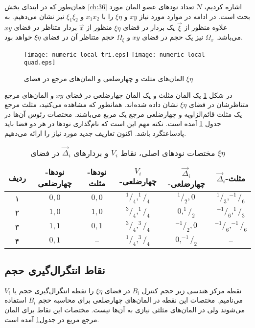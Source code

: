 همان‌طور که در ابتدای بخش \ref{ch:36} اشاره کردیم، $ٔN$ تعداد نود‌های عضو المان مورد بحث است. در ادامه در موارد مورد نیاز $xy$ و $\xi \eta$ را با $x_1x_2$ و $\xi_1 \xi_2$ نیز نشان می‌دهیم. به علاوه منظور از $\vec \xi$ یک بردار در فضای $\xi \eta$ منظور از $\vec x$ بردار متناظر در فضای $xy$ می‌باشد. $\Omega_x$ نیز یک حجم در فضای $xy$ و $\Omega_\xi$ حجم متناظر آن در فضای  $\xi \eta$ خواهد بود.

\begin{figure}[h]
\texttt{[image: numeric-local-tri.eps]} 
\texttt{[image: numeric-local-quad.eps]} 
\caption{المان‌های مثلث و چهارضلعی و المان‌های مرجع در فضای $\xi \eta$}
\label{fig:3poly}
\end{figure}

در شکل \ref{fig:3poly} یک المان مثلث و یک المان چهارضلعی در فضای  $xy$ و المان‌های مرجع متناظرشان  در فضای  $\xi \eta$ نشان داده شده‌اند.  همانطور که مشاهده می‌کنید، مثلث مرجع یک مثلث قائم‌الزاویه و چهارضلعی مرجع یک مربع می‌باشند. مختصات رئوس آن‌ها در جدول \ref{tab:3poly} آمده است. نکته مهم این است که نام‌گذاری نود‌ها در هر دو فضا باید پادساعتگرد باشد. اکنون تعاریف جدید مورد نیاز را ارائه می‌دهیم.

\begin{table}
\centering
\caption{مختصات نود‌های اصلی، نقاط $V_i$ و بردار‌های $\vec \Delta_i$ در فضای $\xi \eta$ }
\label{tab:3poly}
\begin{tabular}{| c | c | c | c | c | c |}
\hline
ردیف &نود‌ها-چهارضلعی & نودها-مثلث &$V_i$-چهارضلعی &$\vec \Delta_i$-چهارضلعی &$\vec \Delta_i$-مثلث \\
\hline
۱ &$0,0$ &$0,0$ &$^1/_4,^1/_4$ &$^1/_2,0$    &$^1/_3,^{-1}/_6$   \\
۲ &$1,0$ &$1,0$ &$^3/_4,^1/_4$ &$0,^1/_2$    &$^{-1}/_6,^1/_3$   \\
۳ &$1,1$ &$0,1$ &$^3/_4,^3/_4$ &$^{-1}/_2,0$ &$^{-1}/_6,^{-1}/_6$ \\
۴ &$0,1$ &-- &$^1/_4,^3/_4$ &$0,^{-1}/_2$ &-- \\
\hline
\end{tabular}
\end{table}

\subsection*{نقاط انتگرال‌گیری حجم}
نقطه مرکز هندسی زیر حجم کنترل $B_i$ در فضای $\xi \eta$ را نقطه انتگرال‌گیری حجم یا $V_i$ می‌نامیم. مختصات این نقطه در المان‌های چهارضلعی برای محاسبه حجم $B_i$ استفاده می‌شوند ولی در المان‌های مثلثی نیازی به آن‌ها نیست. مختصات این نقاط برای المان مرجع مربع در جدول\ref{tab:3poly} آمده‌ است.

